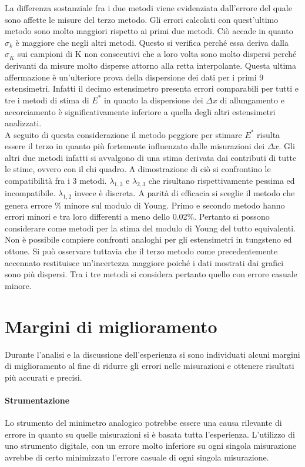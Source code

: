 \documentclass[a4paper,11pt,oneside]{article}
\begin{document}
La differenza sostanziale fra i due metodi viene evidenziata dall'errore del quale sono affette le misure del terzo metodo. Gli errori calcolati con quest'ultimo metodo sono molto maggiori rispetto ai primi due metodi. Ciò accade in quanto $\sigma_k$ è maggiore che negli altri metodi. Questo si verifica perché essa deriva dalla $\sigma_{\overline{K}}$ sui campioni di K non consecutivi che a loro volta sono molto dispersi perché derivanti da misure molto disperse attorno alla retta interpolante. Questa ultima affermazione è un'ulteriore prova della dispersione dei dati per i primi 9 estensimetri. Infatti il decimo estensimetro presenta errori comparabili per tutti e tre i metodi di stima di $E^{\ast}$ in quanto la dispersione dei $\Delta x$ di allungamento e accorciamento è significativamente inferiore a quella degli altri estensimetri analizzati.\\
A seguito di questa considerazione il metodo peggiore per stimare $E^{\ast}$  risulta essere il terzo in quanto più fortemente influenzato dalle misurazioni dei $\Delta x$. Gli altri due metodi infatti si avvalgono di una stima derivata dai contributi di tutte le stime, ovvero con il chi quadro. A dimostrazione di ciò si confrontino le compatibilità fra i 3 metodi. $\lambda_{1,3}$ e $\lambda_{2,3}$ che risultano rispettivamente pessima ed incompatibile. $\lambda_{1,2}$ invece è discreta. A parità di efficacia si sceglie il metodo che genera errore \% minore sul modulo di Young. Primo e secondo metodo hanno errori minori e tra loro differenti a meno dello 0.02\%. Pertanto si possono considerare come metodi per la stima del modulo di Young del tutto equivalenti.\\
Non è possibile compiere confronti analoghi per gli estensimetri in tungsteno ed ottone. Si può osservare tuttavia che il terzo metodo come precedentemente accennato restituisce un'incertezza maggiore poiché i dati mostrati dai grafici sono più dispersi. Tra i tre metodi si considera pertanto quello con errore casuale minore.

\section{Margini di miglioramento}
Durante l'analisi e la discussione dell'esperienza si sono individuati alcuni margini di miglioramento al fine di ridurre gli errori nelle misurazioni e ottenere risultati più accurati e precisi.
\paragraph{Strumentazione}
Lo strumento del minimetro analogico potrebbe essere una causa rilevante di errore in quanto su quelle misurazioni si è basata tutta l'esperienza. L'utilizzo di uno strumento digitale, con un errore molto inferiore su ogni singola misurazione avrebbe di certo minimizzato l'errore casuale di ogni singola misurazione.
\end{document}
